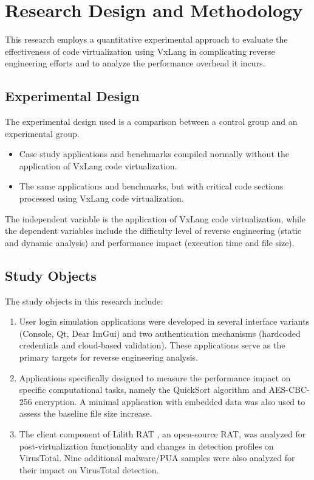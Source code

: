\section{Research Design and Methodology}

This research employs a quantitative experimental approach to evaluate the effectiveness of code virtualization using VxLang in complicating reverse engineering efforts and to analyze the performance overhead it incurs.

\subsection{Experimental Design}
The experimental design used is a comparison between a control group and an experimental group.
\begin{itemize}
    \item {} Case study applications and benchmarks compiled normally without the application of VxLang code virtualization.
    \item {} The same applications and benchmarks, but with critical code sections processed using VxLang code virtualization.
\end{itemize}
The independent variable is the application of VxLang code virtualization, while the dependent variables include the difficulty level of reverse engineering (static and dynamic analysis) and performance impact (execution time and file size).

\subsection{Study Objects}
The study objects in this research include:
\begin{enumerate}
    \item {} User login simulation applications were developed in several interface variants (Console, Qt, Dear ImGui) and two authentication mechanisms (hardcoded credentials and cloud-based validation). These applications serve as the primary targets for reverse engineering analysis.
    \item {} Applications specifically designed to measure the performance impact on specific computational tasks, namely the QuickSort algorithm and AES-CBC-256 encryption. A minimal application with embedded data was also used to assess the baseline file size increase.
    \item {} The client component of Lilith RAT \cite{LilithRAT}, an open-source RAT, was analyzed for post-virtualization functionality and changes in detection profiles on VirusTotal. Nine additional malware/PUA samples were also analyzed for their impact on VirusTotal detection.
\end{enumerate}

